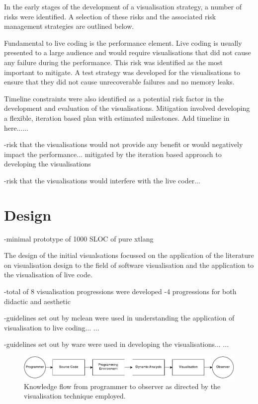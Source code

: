 In the early stages of the development of a visualisation strategy, a number of risks were identified. A selection of these risks and the associated risk management strategies are outlined below.

Fundamental to live coding is the performance element. Live coding is usually presented to a large audience and would require visualisations that did not cause any failure during the performance. This risk was identified as the most important to mitigate. A test strategy was developed for the visualisations to ensure that they did not cause unrecoverable failures and no memory leaks.

Timeline constraints were also identified as a potential risk factor in the development and evaluation of the visualisations. Mitigation involved developing a flexible, iteration based plan with estimated milestones. {\color{red} Add timeline in here......}

-risk that the visualisations would not provide any benefit or would negatively impact the performance... mitigated by the iteration based approach to developing the visualisations

-risk that the visualisations would interfere with the live coder...



\section{Design}

-minimal prototype of 1000 SLOC of pure xtlang

The design of the initial visualsations focussed on the application of the literature on visualisation design to the field of software visualisation and the application to the visualisation of live code.

-total of 8 visualisation progressions were developed
-4 progressions for both didactic and aesthetic

-guidelines set out by mclean were used in understanding the application of visualisation to live coding...
\cite{McLean2010a}...

-guidelines set out by ware were used in developing the visualisations...
\cite{Ware2013a}...


\begin{figure}
  \centering \includegraphics[width=\columnwidth]{../images/diagrams/knowledge-flow-initial.pdf}
  \caption{Knowledge flow from programmer to observer as directed by the visualisation technique employed.}
\label{fig:knowledge-flow-initial}
\end{figure}


